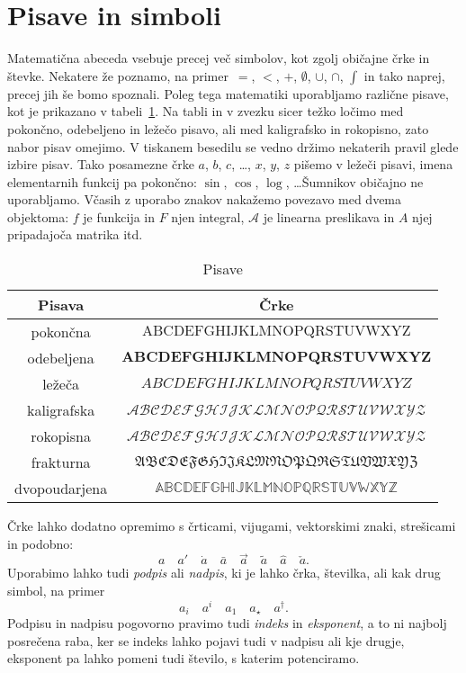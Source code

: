 
\section{Pisave in simboli}
\label{sec:pisave-in-simboli}

Matematična abeceda vsebuje precej več simbolov, kot zgolj običajne črke in števke. Nekatere že poznamo, na primer~$=$, $<$, $+$, $\emptyset$, $\cup$, $\cap$, $\int$ in tako naprej, precej jih še bomo spoznali. Poleg tega matematiki uporabljamo različne pisave, kot je prikazano v tabeli~\ref{tabela:oblike-crk}. Na tabli in v zvezku sicer težko ločimo med pokončno, odebeljeno in ležečo pisavo, ali med kaligrafsko in rokopisno, zato nabor pisav omejimo. V tiskanem besedilu se vedno držimo nekaterih pravil glede izbire pisav. Tako posamezne črke $a$, $b$, $c$, \ldots, $x$, $y$, $z$ pišemo v ležeči pisavi, imena elementarnih funkcij pa pokončno: $\sin$, $\cos$, $\log$, \ldots Šumnikov običajno ne uporabljamo. Včasih z uporabo znakov nakažemo povezavo med dvema objektoma: $f$ je funkcija in $F$ njen integral, $\mathcal{A}$ je linearna preslikava in $A$ njej pripadajoča matrika itd.

\begin{table}[ht]
\centering
\begin{tabular}{c|c}
\textbf{Pisava} & \textbf{Črke} \\
\hline
pokončna & $\mathrm{ABCDEFGHIJKLMNOPQRSTUVWXYZ}$ \\
odebeljena & $\mathbf{ABCDEFGHIJKLMNOPQRSTUVWXYZ}$ \\
ležeča & $ABCDEFGHIJKLMNOPQRSTUVWXYZ$ \\
kaligrafska & $\mathcal{ABCDEFGHIJKLMNOPQRSTUVWXYZ}$ \\
rokopisna & $\mathscr{ABCDEFGHIJKLMNOPQRSTUVWXYZ}$ \\
frakturna & $\mathfrak{ABCDEFGHIJKLMNOPQRSTUVWXYZ}$ \\
dvopoudarjena & $\mathbb{ABCDEFGHIJKLMNOPQRSTUVWXYZ}$
\end{tabular}
\caption{Pisave}\label{tabela:oblike-crk}
\end{table}

Črke lahko dodatno opremimo s črticami, vijugami, vektorskimi znaki, strešicami in podobno:
%
\begin{equation*}
 a \quad
 a' \quad
 \dot{a} \quad
 \bar{a} \quad
 \vec{a} \quad
 \tilde{a} \quad
 \hat{a} \quad
 \check{a}.
\end{equation*}
%
Uporabimo lahko tudi \emph{podpis} ali
\emph{nadpis}, ki je lahko črka, številka, ali kak drug simbol, na primer
%
\begin{equation*}
  a_i \quad
  a^i \quad
  a_1 \quad
  a_{\star} \quad
  a^{\dagger}.
\end{equation*}
%
Podpisu in nadpisu pogovorno pravimo tudi \emph{indeks} in \emph{eksponent}, a to ni
najbolj posrečena raba, ker se indeks lahko pojavi tudi v nadpisu ali kje drugje,
eksponent pa lahko pomeni tudi število, s katerim potenciramo.

